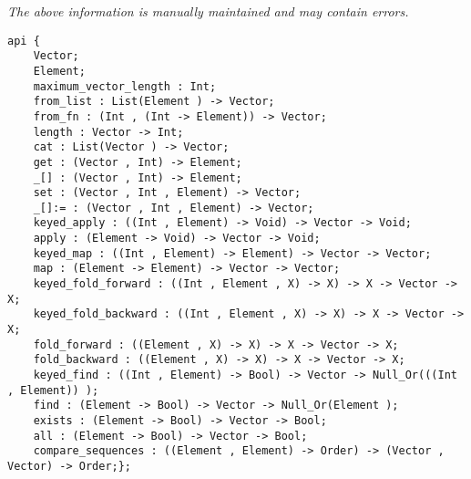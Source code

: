 \label{api:Typelocked\_Vector}

{\tiny \it The above information is manually maintained and may contain errors.}
\begin{verbatim}
api {
    Vector;
    Element;
    maximum_vector_length : Int;
    from_list : List(Element ) -> Vector;
    from_fn : (Int , (Int -> Element)) -> Vector;
    length : Vector -> Int;
    cat : List(Vector ) -> Vector;
    get : (Vector , Int) -> Element;
    _[] : (Vector , Int) -> Element;
    set : (Vector , Int , Element) -> Vector;
    _[]:= : (Vector , Int , Element) -> Vector;
    keyed_apply : ((Int , Element) -> Void) -> Vector -> Void;
    apply : (Element -> Void) -> Vector -> Void;
    keyed_map : ((Int , Element) -> Element) -> Vector -> Vector;
    map : (Element -> Element) -> Vector -> Vector;
    keyed_fold_forward : ((Int , Element , X) -> X) -> X -> Vector -> X;
    keyed_fold_backward : ((Int , Element , X) -> X) -> X -> Vector -> X;
    fold_forward : ((Element , X) -> X) -> X -> Vector -> X;
    fold_backward : ((Element , X) -> X) -> X -> Vector -> X;
    keyed_find : ((Int , Element) -> Bool) -> Vector -> Null_Or(((Int , Element)) );
    find : (Element -> Bool) -> Vector -> Null_Or(Element );
    exists : (Element -> Bool) -> Vector -> Bool;
    all : (Element -> Bool) -> Vector -> Bool;
    compare_sequences : ((Element , Element) -> Order) -> (Vector , Vector) -> Order;};
\end{verbatim}
\index[fun]{\_[]:=}
\index[fun]{\_[]}
